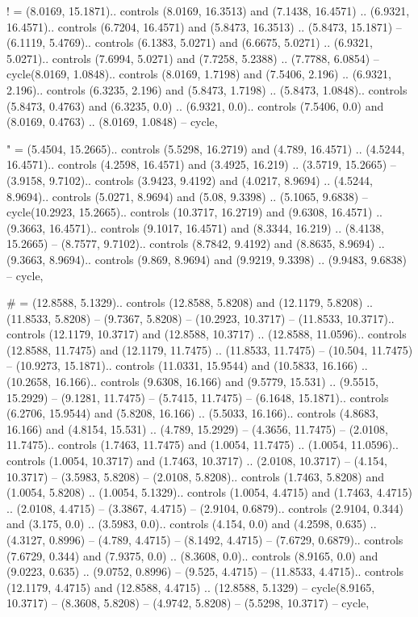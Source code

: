 ! = {(8.0169, 15.1871).. controls (8.0169, 16.3513) and (7.1438, 16.4571) .. (6.9321, 16.4571).. controls (6.7204, 16.4571) and (5.8473, 16.3513) .. (5.8473, 15.1871) -- (6.1119, 5.4769).. controls (6.1383, 5.0271) and (6.6675, 5.0271) .. (6.9321, 5.0271).. controls (7.6994, 5.0271) and (7.7258, 5.2388) .. (7.7788, 6.0854) -- cycle(8.0169, 1.0848).. controls (8.0169, 1.7198) and (7.5406, 2.196) .. (6.9321, 2.196).. controls (6.3235, 2.196) and (5.8473, 1.7198) .. (5.8473, 1.0848).. controls (5.8473, 0.4763) and (6.3235, 0.0) .. (6.9321, 0.0).. controls (7.5406, 0.0) and (8.0169, 0.4763) .. (8.0169, 1.0848) -- cycle},

" = {(5.4504, 15.2665).. controls (5.5298, 16.2719) and (4.789, 16.4571) .. (4.5244, 16.4571).. controls (4.2598, 16.4571) and (3.4925, 16.219) .. (3.5719, 15.2665) -- (3.9158, 9.7102).. controls (3.9423, 9.4192) and (4.0217, 8.9694) .. (4.5244, 8.9694).. controls (5.0271, 8.9694) and (5.08, 9.3398) .. (5.1065, 9.6838) -- cycle(10.2923, 15.2665).. controls (10.3717, 16.2719) and (9.6308, 16.4571) .. (9.3663, 16.4571).. controls (9.1017, 16.4571) and (8.3344, 16.219) .. (8.4138, 15.2665) -- (8.7577, 9.7102).. controls (8.7842, 9.4192) and (8.8635, 8.9694) .. (9.3663, 8.9694).. controls (9.869, 8.9694) and (9.9219, 9.3398) .. (9.9483, 9.6838) -- cycle},

# = {(12.8588, 5.1329).. controls (12.8588, 5.8208) and (12.1179, 5.8208) .. (11.8533, 5.8208) -- (9.7367, 5.8208) -- (10.2923, 10.3717) -- (11.8533, 10.3717).. controls (12.1179, 10.3717) and (12.8588, 10.3717) .. (12.8588, 11.0596).. controls (12.8588, 11.7475) and (12.1179, 11.7475) .. (11.8533, 11.7475) -- (10.504, 11.7475) -- (10.9273, 15.1871).. controls (11.0331, 15.9544) and (10.5833, 16.166) .. (10.2658, 16.166).. controls (9.6308, 16.166) and (9.5779, 15.531) .. (9.5515, 15.2929) -- (9.1281, 11.7475) -- (5.7415, 11.7475) -- (6.1648, 15.1871).. controls (6.2706, 15.9544) and (5.8208, 16.166) .. (5.5033, 16.166).. controls (4.8683, 16.166) and (4.8154, 15.531) .. (4.789, 15.2929) -- (4.3656, 11.7475) -- (2.0108, 11.7475).. controls (1.7463, 11.7475) and (1.0054, 11.7475) .. (1.0054, 11.0596).. controls (1.0054, 10.3717) and (1.7463, 10.3717) .. (2.0108, 10.3717) -- (4.154, 10.3717) -- (3.5983, 5.8208) -- (2.0108, 5.8208).. controls (1.7463, 5.8208) and (1.0054, 5.8208) .. (1.0054, 5.1329).. controls (1.0054, 4.4715) and (1.7463, 4.4715) .. (2.0108, 4.4715) -- (3.3867, 4.4715) -- (2.9104, 0.6879).. controls (2.9104, 0.344) and (3.175, 0.0) .. (3.5983, 0.0).. controls (4.154, 0.0) and (4.2598, 0.635) .. (4.3127, 0.8996) -- (4.789, 4.4715) -- (8.1492, 4.4715) -- (7.6729, 0.6879).. controls (7.6729, 0.344) and (7.9375, 0.0) .. (8.3608, 0.0).. controls (8.9165, 0.0) and (9.0223, 0.635) .. (9.0752, 0.8996) -- (9.525, 4.4715) -- (11.8533, 4.4715).. controls (12.1179, 4.4715) and (12.8588, 4.4715) .. (12.8588, 5.1329) -- cycle(8.9165, 10.3717) -- (8.3608, 5.8208) -- (4.9742, 5.8208) -- (5.5298, 10.3717) -- cycle},

